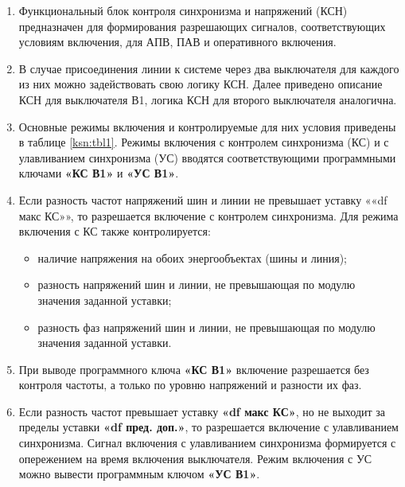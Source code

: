 
\color{black}

\begin{enumerate}[label=\arabic{section}.\arabic{subsection}.\arabic{enumi}, labelsep=4pt, leftmargin=0pt, itemindent=57pt, itemsep=0pt, parsep=0pt] %

\item
Функциональный блок контроля синхронизма и напряжений (КСН) предназначен для формирования разрешающих сигналов, соответствующих условиям включения, для АПВ, ПАВ и оперативного включения.

\item
В случае присоединения линии к системе через два выключателя для каждого из них можно задействовать свою логику КСН. Далее приведено описание КСН для выключателя В1, логика КСН для второго выключателя аналогична.

\item
Основные режимы включения и контролируемые для них условия приведены в таблице \ref{ksn:tbl1}. Режимы включения с контролем синхронизма (КС) и с улавливанием синхронизма (УС) вводятся соответствующими программными ключами \textbf{«КС В1»} и \textbf{«УС В1»}.

\item
Если разность частот напряжений шин и линии не превышает уставку ««df макс КС»», то разрешается включение с контролем синхронизма. Для режима включения с КС также контролируется:
\begin{itemize}
    \item наличие напряжения на обоих энергообъектах (шины и линия);
    \item разность напряжений шин и линии, не превышающая по модулю значения заданной уставки;
    \item разность фаз напряжений шин и линии, не превышающая по модулю значения заданной уставки.
\end{itemize}

\item
При выводе программного ключа \textbf{«КС В1»} включение разрешается без контроля частоты, а только по уровню напряжений и разности их фаз.

\item
Если разность частот превышает уставку \textbf{«df макс КС»}, но не выходит за пределы уставки \textbf{«df пред. доп.»}, то разрешается включение с улавливанием синхронизма. Сигнал включения с улавливанием синхронизма формируется с опережением на время включения выключателя. Режим включения с УС можно вывести программным ключом \textbf{«УС В1»}.


\end{enumerate}
